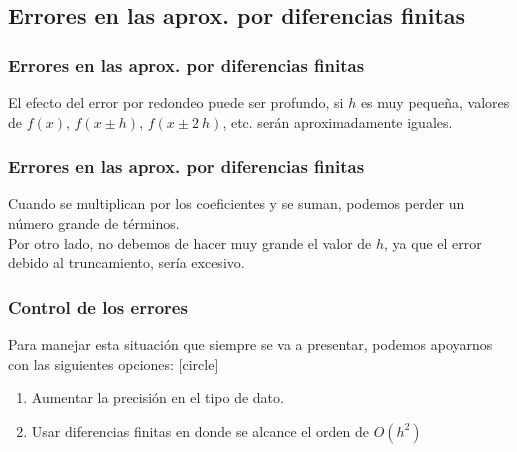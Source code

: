 \subsection{Errores en las aprox. por diferencias finitas}
\begin{frame}
\frametitle{Errores en las aprox. por diferencias finitas}
El efecto del error por redondeo puede ser profundo, si $h$ es muy pequeña, valores de $f(x)$, $f(x \pm h)$, $f(x \pm 2 \: h)$, etc. serán aproximadamente iguales.
\end{frame}
\begin{frame}
\frametitle{Errores en las aprox. por diferencias finitas}
Cuando se multiplican por los coeficientes y se suman, podemos perder un número grande de términos. 
\\
\bigskip
Por otro lado, no debemos de hacer muy grande el valor de $h$, ya que el error debido al truncamiento, sería excesivo.
\end{frame}
\begin{frame}
\frametitle{Control de los errores}
Para manejar esta situación que siempre se va a presentar, podemos apoyarnos con las siguientes opciones:
[circle]
\begin{enumerate}[<+->]
\item Aumentar la precisión en el tipo de dato.
\item Usar diferencias finitas en donde se alcance el orden de $O(h^{2})$
\end{enumerate}
\end{frame}
